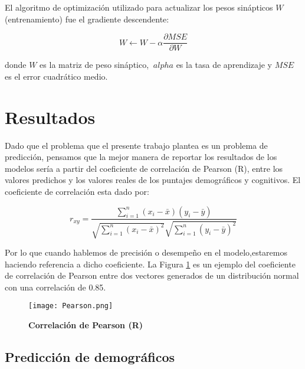 \documentclass[11pt,letterpaper]{article}
\numberwithin{equation}{subsection}
\numberwithin{table}{subsection}
\begin{document}
\bigskip
El algoritmo de optimización utilizado para actualizar los pesos sinápticos $W$ (entrenamiento) fue el gradiente descendente:

\begin{equation}
W \leftarrow W-\alpha \frac{\partial MSE}{\partial W} 
\end{equation}

\bigskip
donde $ W $ es la matriz de peso sináptico, $ \ alpha $ es la tasa de aprendizaje y $ MSE $ es el error cuadrático medio.

\section{Resultados}

\noindent Dado que el problema que el presente trabajo plantea es un problema de predicción, pensamos que la mejor manera de reportar los resultados de los modelos sería a partir del coeficiente de correlación de Pearson (R), entre los valores predichos y los valores reales de los puntajes demográficos y cognitivos. El coeficiente de correlación esta dado por:

\begin{equation}
r_{xy} = \frac{\sum_{i=1}^n(x_i-\bar{x})(y_i-\bar{y})}{\sqrt{\sum_{i=1}^n(x_i-\bar{x})^2}\sqrt{\sum_{i=1}^n(y_i-\bar{y})^2}} 
\end{equation}

\bigskip
\noindent Por lo que cuando hablemos de precisión o desempeño en el modelo,estaremos haciendo referencia a dicho coeficiente. La Figura \ref{fig:Fig17} es un ejemplo del coeficiente de correlación de Pearson entre dos vectores generados de un distribución normal con una correlación de 0.85. 

\bigskip
\begin{figure}[H]
\centering
	\texttt{[image: Pearson.png]}
	\captionsetup{labelfont=bf}
	\caption{\scriptsize \textbf {Correlación de Pearson (R)} }
	\label{fig:Fig17}
\end{figure} 


\subsection{Predicción de demográficos}

\end{document}
